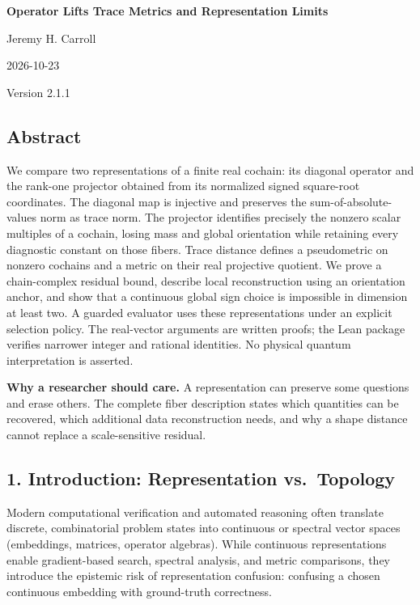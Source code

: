 \documentclass[
  10pt,
]{article}
\author{}
\date{}
\begin{document}
\begin{center}
{\LARGE\bfseries Operator Lifts Trace Metrics and Representation Limits\par}
Jeremy H. Carroll\par
2026-10-23\par
Version 2.1.1\par
\end{center}

\subsection{Abstract}\label{abstract}

We compare two representations of a finite real cochain: its diagonal operator and the rank-one projector obtained from its normalized signed square-root coordinates. The diagonal map is injective and preserves the sum-of-absolute-values norm as trace norm. The projector identifies precisely the nonzero scalar multiples of a cochain, losing mass and global orientation while retaining every diagnostic constant on those fibers. Trace distance defines a pseudometric on nonzero cochains and a metric on their real projective quotient. We prove a chain-complex residual bound, describe local reconstruction using an orientation anchor, and show that a continuous global sign choice is impossible in dimension at least two. A guarded evaluator uses these representations under an explicit selection policy. The real-vector arguments are written proofs; the Lean package verifies narrower integer and rational identities. No physical quantum interpretation is asserted.

\textbf{Why a researcher should care.} A representation can preserve some questions and erase others. The complete fiber description states which quantities can be recovered, which additional data reconstruction needs, and why a shape distance cannot replace a scale-sensitive residual.

\subsection{1. Introduction: Representation vs.~Topology}\label{introduction-representation-vs.-topology}

Modern computational verification and automated reasoning often translate discrete, combinatorial problem states into continuous or spectral vector spaces (embeddings, matrices, operator algebras). While continuous representations enable gradient-based search, spectral analysis, and metric comparisons, they introduce the epistemic risk of representation confusion: confusing a chosen continuous embedding with ground-truth correctness.
\end{document}
